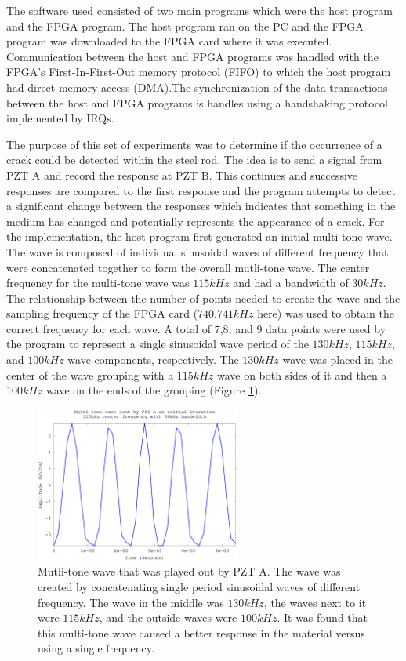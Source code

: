The software used consisted of two main programs which were the host program and the FPGA program. The host program ran on the PC and the FPGA program was downloaded to the FPGA card where it was executed. Communication between the host and FPGA programs was handled with the FPGA's First-In-First-Out memory protocol (FIFO) to which the host program had direct memory access (DMA).The synchronization of the data transactions between the host and FPGA programs is handles using a handshaking protocol implemented by IRQs. 

The purpose of this set of experiments was to determine if the occurrence of a crack could be detected within the steel rod. The idea is to send a signal from PZT A and record the response at PZT B. This continues and successive responses are compared to the first response and the program attempts to detect a significant change between the responses which indicates that something in the medium has changed and potentially represents the appearance of a crack. For the implementation, the host program first generated an initial multi-tone wave. The wave is composed of individual sinusoidal waves of different frequency that were concatenated together to form the overall mutli-tone wave. The center frequency for the multi-tone wave was $115 kHz$ and had a bandwidth of $30 kHz$. The relationship between the number of points needed to create the wave and the sampling frequency of the FPGA card ($740.741 kHz$ here) was used to obtain the correct frequency for each wave. A total of 7,8, and 9 data points were used by the program to represent a single sinusoidal wave period of the $130 kHz$, $115 kHz$, and $100 kHz$ wave components, respectively. The $130 kHz$ wave was placed in the center of the wave grouping with a $115 kHz$ wave on both sides of it and then a $100 kHz$ wave on the ends of the grouping (Figure \ref{fig:initialWave}). 

\begin{figure}[ht!]
\centering
\includegraphics[width=0.6\textwidth]{eps_pics/initialWave}
\caption{Mutli-tone wave that was played out by PZT A. The wave was created by concatenating single period sinusoidal waves of different frequency. The wave in the middle was $130 kHz$, the waves next to it were $115 kHz$, and the outside waves were $100 kHz$. It was found that this multi-tone wave caused a better response in the material versus using a single frequency.
 	 \label{fig:initialWave}} 
\end{figure}

